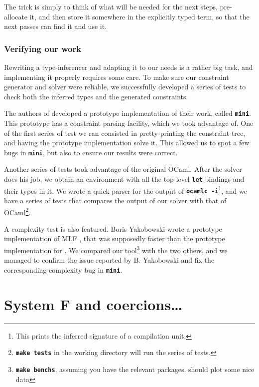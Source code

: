 \documentclass[10pt,a4paper,twoside,titlepage,twocolumn]{article}
\newcommand{\code}[1]{\textbf{\texttt{#1}}}
\begin{document}
The trick is simply to think of what will be needed for the next steps,
pre-allocate it, and then store it somewhere in the explicitly typed term, so
that the next passes can find it and use it.

\section{Verifying our work}

Rewriting a type-inferencer and adapting it to our needs is a rather big task, and
implementing it properly requires some care. To make sure our constraint
generator and solver were reliable, we successfully developed a series of tests
to check both the inferred types and the generated constraints.

The authors of \cite{pottier2005essence} developed a prototype implementation of
their work, called \code{mini}. This prototype has a constraint parsing
facility, which we took advantage of. One of the first series of test we ran
consisted in pretty-printing the constraint tree, and having the prototype
implementation solve it. This allowed us to spot a few bugs in \code{mini}, but
also to ensure our results were correct.

Another series of tests took advantage of the original OCaml. After the solver
does his job, we obtain an environment with all the top-level
\code{let}-bindings and their types in it. We wrote a quick parser for the
output of \code{ocamlc -i}\footnote{This prints the inferred signature of a
compilation unit.}, and we have a series of tests that compares the output of
our solver with that of OCaml\footnote{\code{make tests} in the working
directory will run the series of tests.}.

A complexity test is also featured. Boris Yakobowski wrote a prototype
implementation of MLF \cite{boris2008}, that was supposedly faster than the
prototype implementation for \cite{pottier2005essence}. We compared our
tool\footnote{\code{make benchs}, assuming you have the relevant packages,
should plot some nice data} with the two others, and we managed to confirm the
issue reported by B. Yakobowski and fix the corresponding complexity bug in
\code{mini}.

\part{\label{part:translation}System F and coercions…}
\end{document}
